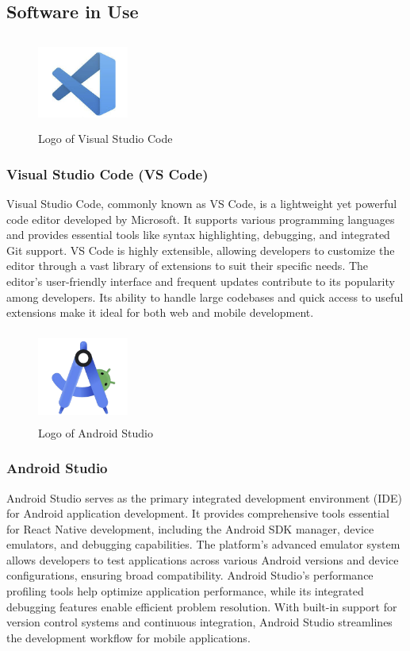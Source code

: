 \documentclass[conference]{IEEEtran}
\begin{document}
            \subsection{Software in Use}
        \begin{figure}[htbp]
            \centerline{\includegraphics[width=3cm, height=3cm]{Images/logo/vsc.png}}
            \caption{Logo of Visual Studio Code}
            \label{fig}
        \end{figure}
        \subsubsection{Visual Studio Code (VS Code)}
            Visual Studio Code, commonly known as VS Code, is a lightweight yet powerful code editor developed by Microsoft. It supports various programming languages and provides essential tools like syntax highlighting, debugging, and integrated Git support. VS Code is highly extensible, allowing developers to customize the editor through a vast library of extensions to suit their specific needs. The editor's user-friendly interface and frequent updates contribute to its popularity among developers. Its ability to handle large codebases and quick access to useful extensions make it ideal for both web and mobile development.

        \begin{figure}[htbp]
            \centerline{\includegraphics[width=3cm, height=3cm]{Images/logo/android.png}}
            \caption{Logo of Android Studio}
            \label{fig}
        \end{figure}
        \subsubsection{Android Studio}
            Android Studio serves as the primary integrated development environment (IDE) for Android application development. It provides comprehensive tools essential for React Native development, including the Android SDK manager, device emulators, and debugging capabilities. The platform's advanced emulator system allows developers to test applications across various Android versions and device configurations, ensuring broad compatibility. Android Studio's performance profiling tools help optimize application performance, while its integrated debugging features enable efficient problem resolution. With built-in support for version control systems and continuous integration, Android Studio streamlines the development workflow for mobile applications.
\end{document}
